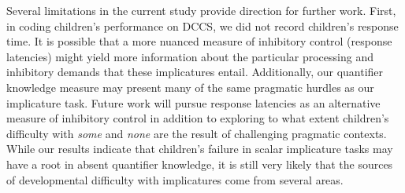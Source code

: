 \documentclass[man]{apa2}
\begin{document}
{Several limitations in the current study provide direction for further work. First, in coding children's performance on DCCS, we did not record children's response time. It is possible that a more nuanced measure of inhibitory control (response latencies) might yield more information about the particular processing and inhibitory demands that these implicatures entail. Additionally, our quantifier knowledge measure \cite{barner2009} may present many of the same pragmatic hurdles as our implicature task.  Future work will pursue response latencies as an alternative measure of inhibitory control in addition to exploring to what extent children's difficulty with \emph{some} and \emph{none} are the result of challenging pragmatic contexts. While our results indicate that children's failure in scalar implicature tasks may have a root in absent quantifier knowledge, it is still very likely that the sources of developmental difficulty with implicatures come from several areas.





}
\end{document}
